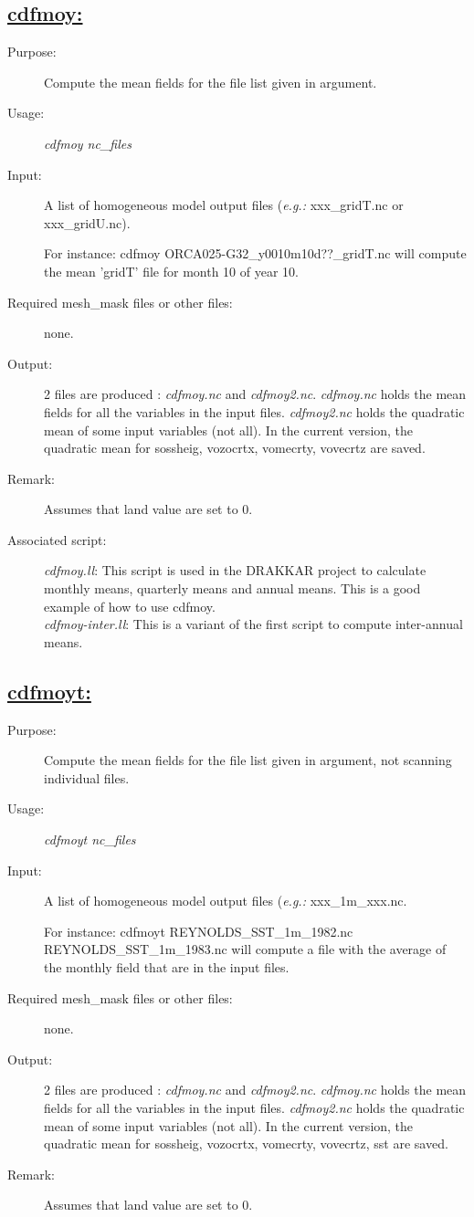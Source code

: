 \documentclass[a4paper,11pt]{article}
\begin{document}
\subsection*{\underline{cdfmoy:}}
\begin{description}
\item[Purpose:] Compute the mean fields for the file list given in argument.
\item[Usage:] {\em cdfmoy nc\_files }
\item[Input:] A list of homogeneous model output files ({\em e.g.: } xxx\_gridT.nc or xxx\_gridU.nc). \

For instance: cdfmoy ORCA025-G32\_y0010m10d??\_gridT.nc will compute the mean 'gridT' file for month 10 of year 10.
\item[Required mesh\_mask files or other files:]  none.
\item[Output:] 2 files are produced : {\em cdfmoy.nc} and {\em cdfmoy2.nc}. {\em cdfmoy.nc} holds the mean fields
for all the variables in the input files. {\em cdfmoy2.nc} holds the quadratic mean of some input variables (not all). 
In the current version, the quadratic mean for sossheig, vozocrtx, vomecrty, vovecrtz are saved.
\item[Remark:] Assumes that land value are set to 0.
\item[Associated script:] {\em cdfmoy.ll}: This script is used in the DRAKKAR project to calculate monthly means, quarterly
means and annual means. This is a good example of how to use cdfmoy.\\
{\em cdfmoy-inter.ll}: This is a variant of the first script to compute inter-annual means.
\end{description}

\subsection*{\underline{cdfmoyt:}}
\begin{description}
\item[Purpose:] Compute the mean fields for the file list given in argument, not scanning individual files.
\item[Usage:] {\em cdfmoyt nc\_files }
\item[Input:] A list of homogeneous model output files ({\em e.g.: } xxx\_1m\_xxx.nc. \

For instance: cdfmoyt REYNOLDS\_SST\_1m\_1982.nc REYNOLDS\_SST\_1m\_1983.nc  will compute a file with the average of the monthly field that are in the input files.
\item[Required mesh\_mask files or other files:]  none.
\item[Output:] 2 files are produced : {\em cdfmoy.nc} and {\em cdfmoy2.nc}. {\em cdfmoy.nc} holds the mean fields
for all the variables in the input files. {\em cdfmoy2.nc} holds the quadratic mean of some input variables (not all). 
In the current version, the quadratic mean for sossheig, vozocrtx, vomecrty, vovecrtz,  sst are saved.
\item[Remark:] Assumes that land value are set to 0.
\end{description}
\end{document}
